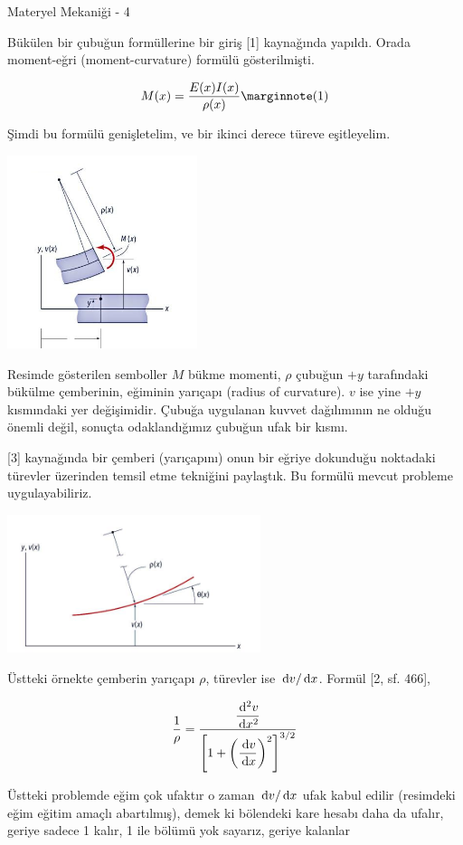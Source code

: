 \documentclass[12pt,fleqn]{article}\usepackage{../../common}
\begin{document}
Materyel Mekaniği - 4

Bükülen bir çubuğun formüllerine bir giriş [1] kaynağında yapıldı. Orada
moment-eğri (moment-curvature) formülü gösterilmişti.

$$
M(x) = \frac{E(x)I(x)}{\rho(x)}
\mlabel{1}
$$

Şimdi bu formülü genişletelim, ve bir ikinci derece türeve eşitleyelim.

\includegraphics[width=15em]{phy_020_strs_05_01.jpg}

Resimde gösterilen semboller $M$ bükme momenti, $\rho$ çubuğun $+y$ tarafındaki
bükülme çemberinin, eğiminin yarıçapı (radius of curvature).  $v$ ise yine $+y$
kısmındaki yer değişimidir. Çubuğa uygulanan kuvvet dağılımının ne olduğu
önemli değil, sonuçta odaklandığımız çubuğun ufak bir kısmı.

[3] kaynağında bir çemberi (yarıçapını) onun bir eğriye dokunduğu noktadaki
türevler üzerinden temsil etme tekniğini paylaştık. Bu formülü mevcut probleme
uygulayabiliriz.

\includegraphics[width=20em]{phy_020_strs_05_02.jpg}

Üstteki örnekte çemberin yarıçapı $\rho$, türevler ise $\,\mathrm{d} v / \,\mathrm{d} x$.
Formül [2, sf. 466],

$$
\frac{1}{\rho} =
\frac
{\dfrac{\,\mathrm{d}^2 v}{\,\mathrm{d} x^2}}
{ \left[ 1 + \left( \dfrac{\,\mathrm{d} v}{\,\mathrm{d} x}  \right)^2 \right]^{3/2} }
$$

Üstteki problemde eğim çok ufaktır o zaman $\,\mathrm{d} v / \,\mathrm{d} x$ ufak kabul edilir
(resimdeki eğim eğitim amaçlı abartılmış), demek ki bölendeki kare hesabı
daha da ufalır, geriye sadece 1 kalır, 1 ile bölümü yok sayarız, geriye kalanlar
\end{document}
